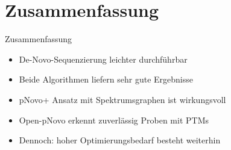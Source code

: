 \documentclass{beamer}
\newcommand{\highlightColor}{nDarkBlue!55!}
\begin{document}
    \section{Zusammenfassung}
   \begin{frame}{Zusammenfassung}
     \begin{itemize}
     \item<1-> De-Novo-Sequenzierung leichter durchführbar
     \item<1-> Beide Algorithmen liefern \textcolor{\highlightColor}{sehr gute} Ergebnisse
     \item<1-> pNovo+ Ansatz mit Spektrumsgraphen ist wirkungsvoll
      \item<1-> Open-pNovo erkennt zuverlässig Proben mit PTMs
      \vspace*{0.5cm}
      \item<2-> Dennoch: hoher Optimierungsbedarf besteht weiterhin
     \end{itemize}
    \end{frame}
\end{document}
